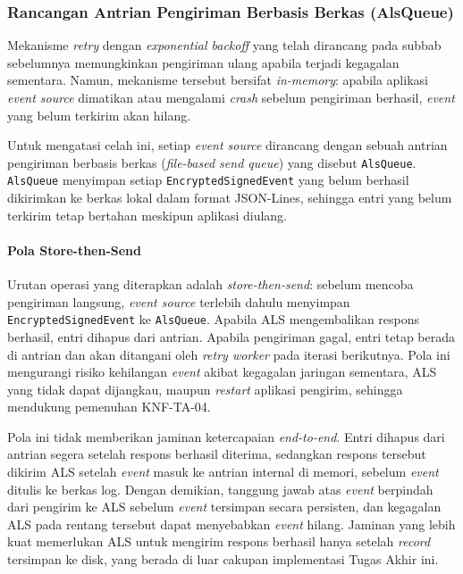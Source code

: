 \subsubsection{Rancangan Antrian Pengiriman Berbasis Berkas (AlsQueue)}
\label{subsubsec:rancangan-als-queue}

Mekanisme \textit{retry} dengan \textit{exponential backoff} yang telah
dirancang pada subbab sebelumnya memungkinkan pengiriman ulang apabila terjadi
kegagalan sementara. Namun, mekanisme tersebut bersifat \textit{in-memory}:
apabila aplikasi \textit{event source} dimatikan atau mengalami \textit{crash}
sebelum pengiriman berhasil, \textit{event} yang belum terkirim akan hilang.

Untuk mengatasi celah ini, setiap \textit{event source} dirancang dengan
sebuah antrian pengiriman berbasis berkas (\textit{file-based send queue}) yang
disebut \texttt{AlsQueue}. \texttt{AlsQueue} menyimpan setiap
\texttt{EncryptedSignedEvent} yang belum berhasil dikirimkan ke berkas lokal
dalam format JSON-Lines, sehingga entri yang belum terkirim tetap bertahan
meskipun aplikasi diulang.

\paragraph{Pola Store-then-Send}

Urutan operasi yang diterapkan adalah \textit{store-then-send}: sebelum mencoba
pengiriman langsung, \textit{event source} terlebih dahulu menyimpan
\texttt{EncryptedSignedEvent} ke \texttt{AlsQueue}. Apabila ALS mengembalikan
respons berhasil, entri dihapus dari antrian. Apabila pengiriman gagal, entri
tetap berada di antrian dan akan ditangani oleh \textit{retry worker} pada
iterasi berikutnya. Pola ini mengurangi risiko kehilangan \textit{event} akibat
kegagalan jaringan sementara, ALS yang tidak dapat dijangkau, maupun
\textit{restart} aplikasi pengirim, sehingga mendukung pemenuhan KNF-TA-04.

Pola ini tidak memberikan jaminan ketercapaian \textit{end-to-end}. Entri
dihapus dari antrian segera setelah respons berhasil diterima, sedangkan
respons tersebut dikirim ALS setelah \textit{event} masuk ke antrian internal
di memori, sebelum \textit{event} ditulis ke berkas log. Dengan demikian,
tanggung jawab atas \textit{event} berpindah dari pengirim ke ALS sebelum
\textit{event} tersimpan secara persisten, dan kegagalan ALS pada rentang
tersebut dapat menyebabkan \textit{event} hilang. Jaminan yang lebih kuat
memerlukan ALS untuk mengirim respons berhasil hanya setelah \textit{record}
tersimpan ke disk, yang berada di luar cakupan implementasi Tugas Akhir ini.

